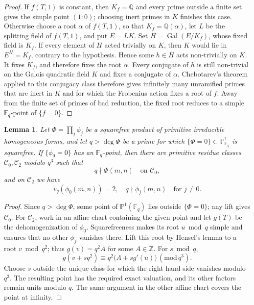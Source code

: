 \documentclass[12pt,reqno]{amsart}
\numberwithin{equation}{section}
\newtheorem{lemma}[theorem]{Lemma}
\theoremstyle{definition}
\newcommand{\PP}{\mathbb{P}}
\newcommand{\FF}{\mathbb{F}}
\newcommand{\ZZ}{\mathbb{Z}}
\newcommand{\QQ}{\mathbb{Q}}
\DeclareMathOperator{\Gal}{Gal}
\renewcommand{\pmod}[1]{\,(\mathrm{mod}\,#1)}
\begin{document}
\begin{proof}
If $f(T,1)$ is constant, then $K_f=\QQ$ and every prime outside a finite set gives the simple point $(1:0)$; choosing inert primes in $K$ finishes this case.
Otherwise choose a root $\alpha$ of $f(T,1)$, so that $K_f=\QQ(\alpha)$, let $L$ be the splitting field of $f(T,1)$, and put $E=LK$.
Set $H=\Gal(E/K_f)$, whose fixed field is $K_f$.
If every element of $H$ acted trivially on $K$, then $K$ would lie in $E^H=K_f$, contrary to the hypothesis.
Hence some $h\in H$ acts non-trivially on $K$.
It fixes $K_f$, and therefore fixes the root $\alpha$.
Every conjugate of $h$ is still non-trivial on the Galois quadratic field $K$ and fixes a conjugate of $\alpha$.
Chebotarev's theorem applied to this conjugacy class therefore gives infinitely many unramified primes that are inert in $K$ and for which the Frobenius action fixes a root of $f$.
Away from the finite set of primes of bad reduction, the fixed root reduces to a simple $\FF_q$-point of $\{f=0\}$.
\end{proof}

\begin{lemma}\label{lem:exact-valuation-classes}
Let $\Phi=\prod_j\phi_j$ be a squarefree product of primitive irreducible homogeneous forms, and let $q>\deg\Phi$ be a prime for which $\{\Phi=0\}\subset\PP^1_{\FF_q}$ is squarefree.
If $\{\phi_0=0\}$ has an $\FF_q$-point, then there are primitive residue classes $\mathcal C_0,\mathcal C_2$ modulo $q^3$ such that
\[
q\nmid\Phi(m,n)\quad\text{on }\mathcal C_0,
\]
and on $\mathcal C_2$ we have
\[
v_q(\phi_0(m,n))=2,\quad
q\nmid\phi_j(m,n)\quad\text{for }j\ne0.
\]
\end{lemma}

\begin{proof}
Since $q>\deg\Phi$, some point of $\PP^1(\FF_q)$ lies outside $\{\Phi=0\}$; any lift gives $\mathcal C_0$.
For $\mathcal C_2$, work in an affine chart containing the given point and let $g(T)$ be the dehomogenization of $\phi_0$.
Squarefreeness makes its root $u\bmod q$ simple and ensures that no other $\phi_j$ vanishes there.
Lift this root by Hensel's lemma to a root $v\bmod q^2$; thus $g(v)=q^2A$ for some $A\in\ZZ$.
For $s\bmod q$,
\[
g(v+sq^2)\equiv q^2\bigl(A+s g'(u)\bigr)\pmod{q^3}.
\]
Choose $s$ outside the unique class for which the right-hand side vanishes modulo $q^3$.
The resulting point has the required exact valuation, and its other factors remain units modulo $q$.
The same argument in the other affine chart covers the point at infinity.
\end{proof}
\end{document}
